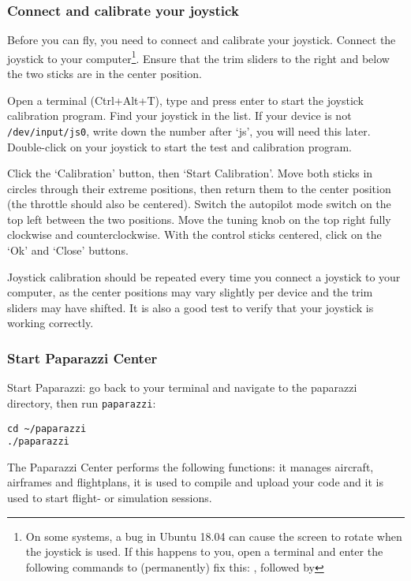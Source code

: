 \documentclass{article}
\begin{document}
\subsubsection*{Connect and calibrate your joystick}
Before you can fly, you need to connect and calibrate your joystick.
Connect the joystick to your computer\footnote{On some systems, a bug in Ubuntu 18.04 can cause the screen to rotate when the joystick is used. If this happens to you, open a terminal and enter the following commands to (permanently) fix this: , followed by }.
Ensure that the trim sliders to the right and below the two sticks are in the center position.

Open a terminal (Ctrl+Alt+T), type  and press enter to start the joystick calibration program. Find your joystick in the list. If your device is not \verb"/dev/input/js0", write down the number after `js', you will need this later. Double-click on your joystick to start the test and calibration program.

Click the `Calibration' button, then `Start Calibration'. Move both sticks in circles through their extreme positions, then return them to the center position (the throttle should also be centered). Switch the autopilot mode switch on the top left between the two positions. Move the tuning knob on the top right fully clockwise and counterclockwise. With the control sticks centered, click on the `Ok' and `Close' buttons.

Joystick calibration should be repeated every time you connect a joystick to your computer, as the center positions may vary slightly per device and the trim sliders may have shifted. It is also a good test to verify that your joystick is working correctly.

\subsubsection*{Start Paparazzi Center}
Start Paparazzi: go back to your terminal and navigate to the paparazzi directory, then run \texttt{paparazzi}:
\begin{lstlisting}[style=Bash]
cd ~/paparazzi
./paparazzi
\end{lstlisting}

\medskip
The Paparazzi Center performs the following functions: it manages aircraft, airframes and flightplans, it is used to compile and upload your code and it is used to start flight- or simulation sessions.
\end{document}
